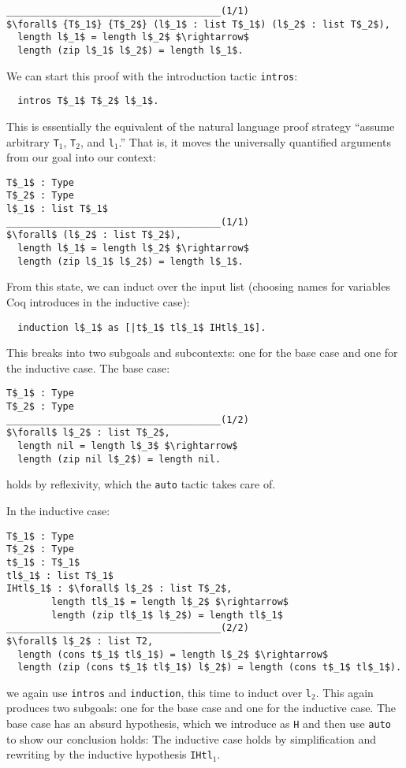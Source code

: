 \begin{lstlisting}
______________________________________(1/1)
$\forall$ {T$_1$} {T$_2$} (l$_1$ : list T$_1$) (l$_2$ : list T$_2$),
  length l$_1$ = length l$_2$ $\rightarrow$
  length (zip l$_1$ l$_2$) = length l$_1$.
\end{lstlisting}
We can start this proof with the introduction tactic \lstinline{intros}:

\begin{lstlisting}
  intros T$_1$ T$_2$ l$_1$.
\end{lstlisting}
This is essentially the equivalent of the natural language proof strategy ``assume arbitrary \lstinline{T}$_1$, \lstinline{T}$_2$, and \lstinline{l}$_1$.''
That is, it moves the universally quantified arguments from our goal into our context:

\begin{lstlisting}
T$_1$ : Type
T$_2$ : Type
l$_1$ : list T$_1$
______________________________________(1/1)
$\forall$ (l$_2$ : list T$_2$),
  length l$_1$ = length l$_2$ $\rightarrow$
  length (zip l$_1$ l$_2$) = length l$_1$.
\end{lstlisting}
From this state, we can induct over the input list (choosing names for variables Coq introduces in the inductive case):

\begin{lstlisting}
  induction l$_1$ as [|t$_1$ tl$_1$ IHtl$_1$].
\end{lstlisting}
This breaks into two subgoals and subcontexts: one for the base case and one for the inductive case.
The base case:
\begin{lstlisting}
T$_1$ : Type
T$_2$ : Type
______________________________________(1/2)
$\forall$ l$_2$ : list T$_2$,
  length nil = length l$_3$ $\rightarrow$
  length (zip nil l$_2$) = length nil.
\end{lstlisting}
holds by reflexivity, which the \lstinline{auto} tactic takes care of.

In the inductive case:

\begin{lstlisting}
T$_1$ : Type
T$_2$ : Type
t$_1$ : T$_1$
tl$_1$ : list T$_1$
IHtl$_1$ : $\forall$ l$_2$ : list T$_2$,
        length tl$_1$ = length l$_2$ $\rightarrow$
        length (zip tl$_1$ l$_2$) = length tl$_1$
______________________________________(2/2)
$\forall$ l$_2$ : list T2,
  length (cons t$_1$ tl$_1$) = length l$_2$ $\rightarrow$
  length (zip (cons t$_1$ tl$_1$) l$_2$) = length (cons t$_1$ tl$_1$).
\end{lstlisting}
we again use \lstinline{intros} and \lstinline{induction}, this time to induct over \lstinline{l}$_2$.
This again produces two subgoals: one for the base case and one for the inductive case.
The base case has an absurd hypothesis, which we introduce as \lstinline{H} and then use \lstinline{auto} to show our conclusion holds:
The inductive case holds by simplification and rewriting by the inductive hypothesis \lstinline{IHtl}$_1$. %

